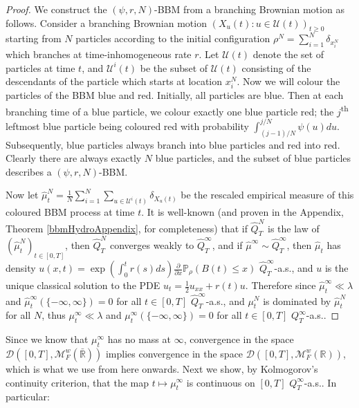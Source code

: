 \documentclass{article}
\newcommand{\B}[1]{\mathbb{#1}}
\newcommand{\C}[1]{\mathcal{#1}}
\begin{document}
\begin{proof}
    We construct the $(\psi,r,N)$-BBM from a branching Brownian motion as follows. Consider a branching Brownian motion $(X_u(t):u\in \C{U}(t))_{t\geq 0}$ starting from $N$ particles according to the initial configuration $\rho^N=\sum_{i=1}^N \delta_{x_i^N}$ which branches at time-inhomogeneous rate $r$. Let $\C{U}(t)$ denote the set of particles at time $t$, and $\C{U}^i(t)$ be the subset of $\C{U}(t)$ consisting of the descendants of the particle which starts at location $x_i^N$. Now we will colour the particles of the BBM blue and red. Initially, all particles are blue. Then at each branching time of a blue particle, we colour exactly one blue particle red; the $j$\textsuperscript{th} leftmost blue particle being coloured red with probability $\int_{(j-1)/N}^{j/N}\psi(u)du$. Subsequently, blue particles always branch into blue particles and red into red. Clearly there are always exactly $N$ blue particles, and the subset of blue particles describes a $(\psi,r,N)$-BBM. 
    
    Now let $\hat{\mu}^N_t = \frac1N \sum_{i=1}^N\sum_{u\in \C{U}^i(t)}\delta_{X_u(t)}$ be the rescaled empirical measure of this coloured BBM process at time $t$. It is well-known (and proven in the Appendix, Theorem \ref{bbmHydroAppendix}, for completeness) that if $\hat{Q}_T^N$ is the law of $(\hat{\mu}_t^N)_{t\in [0,T]}$, then $\hat{Q}_T^N$ converges weakly to $\hat{Q}_T^\infty$, and if $\hat{\mu}^\infty \sim \hat{Q}^\infty_T$, then $\hat{\mu}_t$ has density $u(x,t)=\exp(\int_0^t r(s)ds)\frac{\partial}{\partial x}\B{P}_\rho(B(t)\leq x)$ $\hat{Q}^\infty_T$-a.s., and $u$ is the unique classical solution to the PDE $u_t=\frac12u_{xx}+r(t)u$. Therefore since $\hat{\mu}_t^\infty\ll \lambda$ and $\hat{\mu}_t^\infty(\{-\infty,\infty\})=0$ for all $t\in [0,T]$ $\hat{Q}^\infty_T$-a.s., and $\mu_t^N$ is dominated by $\hat{\mu}_t^N$ for all $N$, thus $\mu_t^\infty\ll \lambda$ and $\mu_t^\infty(\{-\infty,\infty\})=0$ for all $t\in [0,T]$ $Q^\infty_T$-a.s..
\end{proof}

Since we know that $\mu_t^\infty$ has no mass at $\infty$, convergence in the space $\C{D}([0,T],\C{M}^w_F(\bar{\B{R}}))$ implies convergence in the space $\C{D}([0,T],\C{M}^w_F(\B{R}))$, which is what we use from here onwards. Next we show, by Kolmogorov's continuity criterion, that the map $t\mapsto \mu_t^\infty$ is continuous on $[0,T]$ $Q^\infty_T$-a.s.. In particular:
\end{document}
